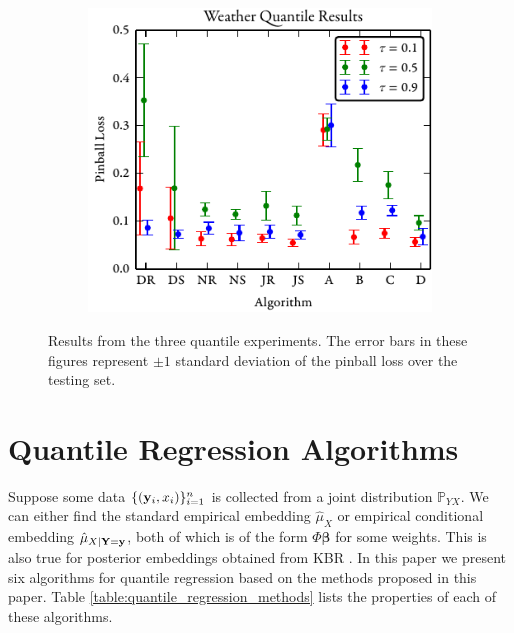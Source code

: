 \documentclass[twoside]{article} \usepackage{aistats2017}
\theoremstyle{definition}
\theoremstyle{theorem}
\newcommand{\rv}[1]{{#1}}
\begin{document}
\begin{figure}[t]
\begin{subfigure}[b]{0.32\textwidth}
		\end{subfigure}
		\begin{subfigure}[b]{0.32\textwidth}
			\includegraphics[width=\textwidth]{figures/Weather_results}
		\end{subfigure}
		\caption{Results from the three quantile experiments. The error bars in these figures represent $\pm 1$ standard deviation of the pinball loss over the testing set.}
		\label{fig:qfull}
	\end{figure}

\section{Quantile Regression Algorithms}
\label{sec:quantile_regression_algorithms}
	
	Suppose some data $\{(\mathbf{y}_{i}, x_{i})\}_{i = 1}^{n}$ is collected from a joint distribution $\mathbb{P}_{\rv{Y} \rv{X}}$. We can either find the standard empirical embedding $\hat{\mu}_{\rv{X}}$ or empirical conditional embedding $\hat{\mu}_{\rv{X} | \bvec{\rv{Y}} = \bvec{y}}$, both of which is of the form $\Phi \bm{\beta}$ for some weights. This is also true for posterior embeddings obtained from KBR \citep{fukumizu2013kernel}. In this paper we present six algorithms for quantile regression based on the methods proposed in this paper. Table \ref{table:quantile_regression_methods} lists the properties of each of these algorithms.
\end{document}
